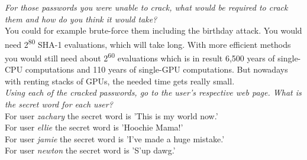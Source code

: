 \textit{For those passwords you were unable to crack, what would be required to crack them and how do you think it would take?}\\
You could for example brute-force them including the birthday attack. You would need 2\textsuperscript{80} SHA-1 evaluations, which will take long. With more efficient methods you would still need about 2\textsuperscript{60} evaluations which is in result 6,500 years of single-CPU computations and 110 years of single-GPU computations. But nowadays with renting stacks of GPUs, the needed time gets really small.\\


\textit{Using each of the cracked passwords, go to the user's respective web page. What is the secret word for each user?}\\
For user \textit{zachary} the secret word is 'This is my world now.'\\
For user \textit{ellie} the secret word is 'Hoochie Mama!'\\
For user \textit{jamie} the secret word is 'I've made a huge mistake.'\\
For user \textit{newton} the secret word is 'S'up dawg.'\\
